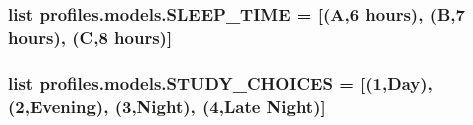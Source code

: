 \subsubsection[{\texorpdfstring{S\+L\+E\+E\+P\+\_\+\+T\+I\+ME}{SLEEP_TIME}}]{\setlength{\rightskip}{0pt plus 5cm}list profiles.\+models.\+S\+L\+E\+E\+P\+\_\+\+T\+I\+ME = \mbox{[}(\textquotesingle{}A\textquotesingle{},\textquotesingle{}6 hours\textquotesingle{}), (\textquotesingle{}B\textquotesingle{},\textquotesingle{}7 hours\textquotesingle{}), (\textquotesingle{}C\textquotesingle{},\textquotesingle{}8 hours\textquotesingle{})\mbox{]}}\hypertarget{namespaceprofiles_1_1models_a7111936f7e1fe09a6a5305105cc13029}{}\label{namespaceprofiles_1_1models_a7111936f7e1fe09a6a5305105cc13029}
\subsubsection[{\texorpdfstring{S\+T\+U\+D\+Y\+\_\+\+C\+H\+O\+I\+C\+ES}{STUDY_CHOICES}}]{\setlength{\rightskip}{0pt plus 5cm}list profiles.\+models.\+S\+T\+U\+D\+Y\+\_\+\+C\+H\+O\+I\+C\+ES = \mbox{[}(\textquotesingle{}1\textquotesingle{},\textquotesingle{}Day\textquotesingle{}),(\textquotesingle{}2\textquotesingle{},\textquotesingle{}Evening\textquotesingle{}), (\textquotesingle{}3\textquotesingle{},\textquotesingle{}Night\textquotesingle{}), (\textquotesingle{}4\textquotesingle{},\textquotesingle{}Late Night\textquotesingle{})\mbox{]}}\hypertarget{namespaceprofiles_1_1models_a66a49fea9e1603c3395bc387e385d6e1}{}\label{namespaceprofiles_1_1models_a66a49fea9e1603c3395bc387e385d6e1}
